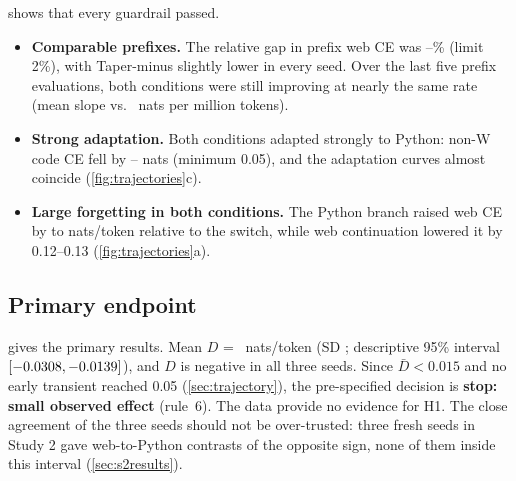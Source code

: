\documentclass[11pt]{article}
\begin{document}
 shows that every guardrail passed.
\begin{itemize}[leftmargin=1.4em,itemsep=2pt]
  \item \textbf{Comparable prefixes.} The relative gap in prefix web CE was \gapMin--\gapMax\% (limit 2\%),
        with Taper-minus slightly lower in every seed. Over the last five prefix evaluations, both conditions were
        still improving at nearly the same rate (mean slope \slopeRMS{} vs.\ \slopeTaper{} nats per million
        tokens).
  \item \textbf{Strong adaptation.} Both conditions adapted strongly to Python: non-W code CE fell by
        \adaptMin--\adaptMax{} nats (minimum 0.05), and the adaptation curves almost coincide
        (\cref{fig:trajectories}c).
  \item \textbf{Large forgetting in both conditions.} The Python branch raised web CE by \FcodeMin{} to
        \FcodeMax{} nats/token relative to the switch, while web continuation lowered it by 0.12--0.13
        (\cref{fig:trajectories}a).
\end{itemize}

\begin{table}[t]
\centering
\small
\caption{Validity checks and actual forgetting $F$ (full-dev web CE, nats/token). ``Gap'' is the absolute prefix
web-CE difference relative to RMS (limit 2\%). ``Code gain'' is the Python branch's reduction in non-W code CE
from the switch to $s = 6{,}104$ (minimum 0.05).}
\label{tab:validity}

\end{table}

\subsection{Primary endpoint}

\begin{table}[t]
\centering
\small
\caption{Primary contrast $D$ at $s = 6{,}104$ and secondary contrasts (nats/token; full development set). Positive
values mean more excess web forgetting for Taper-minus. ``Matched'' is the matched-adaptation differential
forgetting at the furthest target reached by every seed ($s = \matchedTarget$).}
\label{tab:primary}

\end{table}

 gives the primary results. Mean $D$ = \Dmean{}~nats/token (SD \Dsd; descriptive 95\% interval
$[-0.0308, -0.0139]$), and $D$ is negative in all three seeds. Since $\bar D < 0.015$ and no early transient reached
0.05 (\cref{sec:trajectory}), the pre-specified decision is \textbf{stop: small observed effect} (rule~6). The
data provide no evidence for H1. The close agreement of the three seeds should not be over-trusted: three fresh
seeds in Study 2 gave web-to-Python contrasts of the opposite sign, none of them inside this interval
(\cref{sec:s2results}).
\end{document}
